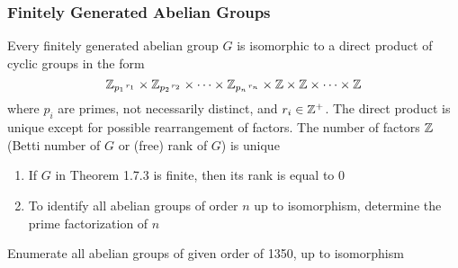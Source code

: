 \subsubsection{Finitely Generated Abelian Groups}

\begin{theorem} 
    Every finitely generated abelian group $G$ is isomorphic to a direct product of cyclic groups in the form
    \[ \mathbb{Z}_{p_1 \hspace{0.1em}^{r_1}} \times \mathbb{Z}_{p_2 \hspace{0.1em}^{r_2}} \times \cdots \times \mathbb{Z}_{p_n \hspace{0.1em}^{r_n}} \times \mathbb{Z} \times \mathbb{Z} \times \cdots \times \mathbb{Z} \]
    where $p_i$ are primes, not necessarily distinct, and $r_i \in \mathbb{Z}^+$. The direct product is unique except for possible rearrangement of factors. The number of factors $\mathbb{Z}$ (Betti number of $G$ or (free) rank of $G$) is unique
\end{theorem}

\begin{remark} \phantom{blank}
    \begin{enumerate}
        \item If $G$ in Theorem 1.7.3 is finite, then its rank is equal to 0
        \item To identify all abelian groups of order $n$ up to isomorphism, determine the prime factorization of $n$
    \end{enumerate}
\end{remark}

\begin{exercise}
    Enumerate all abelian groups of given order of 1350, up to isomorphism
\end{exercise}

